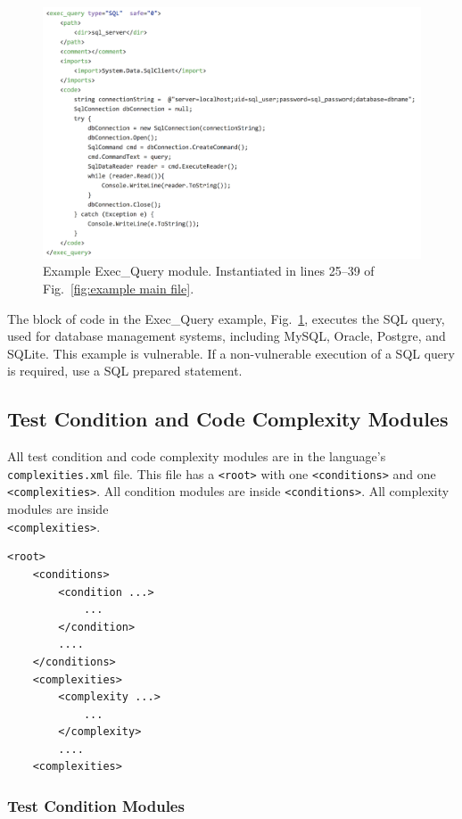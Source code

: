 \documentclass[12pt]{article}
\begin{document}
\begin{figure}[htbp]
  \includegraphics[width=\linewidth]{fig_Exec_Query_file.png}
  \caption{Example Exec\_Query module. Instantiated in lines 25--39 of
    Fig.~\ref{fig:example main file}.}
  \label{fig:example exec-query file}
\end{figure}

The block of code in the Exec\_Query example, 
Fig.~\ref{fig:example exec-query file}, executes the SQL query, used 
for database management
systems, including MySQL, Oracle, Postgre, and SQLite.  This example is 
vulnerable.  If a non-vulnerable execution of a SQL query is required, 
use a SQL prepared statement.


\subsection{Test Condition and Code Complexity Modules}

All test condition and code complexity modules are in the 
language's \verb|complexities.xml| file.  This file has
a \verb|<root>| with one \verb|<conditions>| and one
\verb|<complexities>|.
All condition modules are inside \verb|<conditions>|.  All
complexity modules are inside \\ \verb|<complexities>|.

\begin{verbatim}
<root>
    <conditions>
        <condition ...>
            ...
        </condition>
        ....
    </conditions>
    <complexities>
        <complexity ...>
            ...
        </complexity>
        ....
    <complexities>
\end{verbatim}

\subsubsection{Test Condition Modules}
\label{sec: condition modules}
\end{document}
